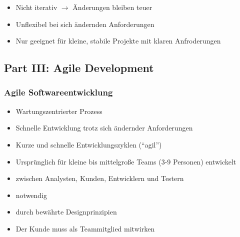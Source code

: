     \begin{itemize}
        \item Nicht iterativ $\rightarrow$ Änderungen bleiben teuer
        \item Unflexibel bei sich ändernden Anforderungen
        \item Nur geeignet für kleine, stabile Projekte mit klaren Anfroderungen
    \end{itemize}

\subsection{Part III: Agile Development}
\subsubsection*{Agile Softwareentwicklung}

    \begin{itemize}
        \item Wartungszentrierter Prozess
        \item Schnelle Entwicklung trotz sich ändernder Anforderungen
        \item Kurze und schnelle Entwicklungszyklen (\enquote{agil})
        \item Ursprünglich für kleine bis mittelgroße Teams (3-9 Personen) entwickelt
    \end{itemize}
    \begin{itemize}
        \item {} zwischen Analysten, Kunden, Entwicklern und Testern
        \item {} notwendig
        \item {} durch bewährte Designprinzipien
        \item {} Der Kunde muss als Teammitglied mitwirken
    \end{itemize}

